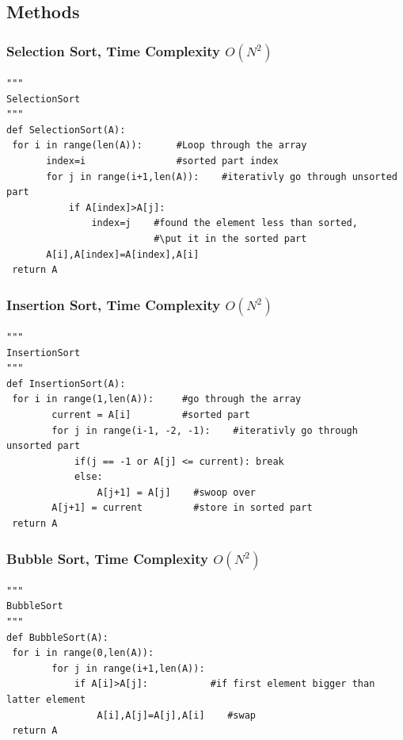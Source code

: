 \documentclass{article}
\begin{document}
\newpage

\subsection*{Methods}

\subsubsection*{Selection Sort, Time Complexity $O(N^2)$}
\begin{lstlisting}[style = py]
"""
SelectionSort
"""
def SelectionSort(A):
 for i in range(len(A)):      #Loop through the array
       index=i                #sorted part index
       for j in range(i+1,len(A)):    #iterativly go through unsorted part
           if A[index]>A[j]:      
               index=j    #found the element less than sorted, 
                          #\put it in the sorted part
       A[i],A[index]=A[index],A[i]
 return A
\end{lstlisting}

\subsubsection*{Insertion Sort, Time Complexity $O(N^2)$}
\begin{lstlisting}[style = py]
"""
InsertionSort
"""
def InsertionSort(A):
 for i in range(1,len(A)):     #go through the array
        current = A[i]         #sorted part
        for j in range(i-1, -2, -1):    #iterativly go through unsorted part
            if(j == -1 or A[j] <= current): break
            else:
                A[j+1] = A[j]    #swoop over
        A[j+1] = current         #store in sorted part
 return A
\end{lstlisting}

\newpage
\subsubsection*{Bubble Sort, Time Complexity $O(N^2)$}
\begin{lstlisting}[style = py]
"""
BubbleSort
"""
def BubbleSort(A):
 for i in range(0,len(A)):    
        for j in range(i+1,len(A)):   
            if A[i]>A[j]:           #if first element bigger than latter element
                A[i],A[j]=A[j],A[i]    #swap
 return A

\end{lstlisting}
\end{document}
